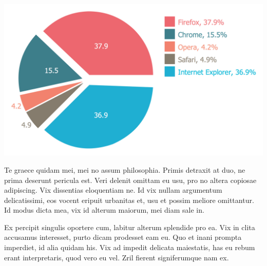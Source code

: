 \documentclass[12pt,a4paper,twocolumn]{article}
\begin{document}
    \begin{center}\includegraphics[scale=0.3]{Chart3}\end{center}
    
    Te graece quidam mei, mei no assum philosophia. Primis detraxit at duo, ne prima deserunt pericula est. Veri delenit omittam eu usu, pro no altera copiosae adipiscing. Vix dissentias eloquentiam ne. Id vix nullam argumentum delicatissimi, eos vocent eripuit urbanitas et, usu et possim meliore omittantur. Id modus dicta mea, vix id alterum maiorum, mei diam sale in.
    
    Ex percipit singulis oportere cum, labitur alterum splendide pro ea. Vix in clita accusamus interesset, purto dicam prodesset eam eu. Quo et inani prompta imperdiet, id alia quidam his. Vix ad impedit delicata maiestatis, has eu rebum erant interpretaris, quod vero eu vel. Zril fierent signiferumque nam ex.
    
\end{document}
